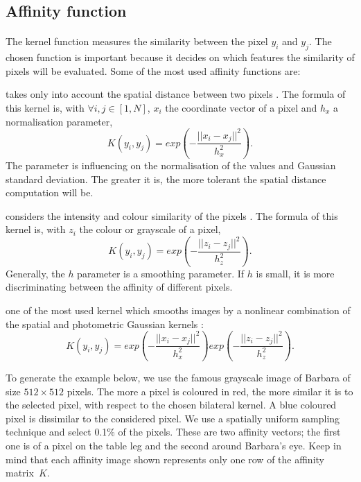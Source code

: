 \subsection{Affinity function}
\label{variations:affinity_functions}

\paragraph{}
The kernel function measures the similarity between the pixel \(y_i\) and \(y_j\).
The chosen function is important because it decides on which features the similarity of pixels will be evaluated.
Some of the most used affinity functions are:

\begin{description}[align=left]
 \item [Spatial Gaussian Kernel] takes only into account the spatial distance between two pixels \cite{siam_slides_2016}.
  The formula of this kernel is, with \(\forall i, j \in [1, N]\), \(x_i\) the coordinate vector of a pixel and \(h_x\) a normalisation parameter,
  \[K(y_i, y_j) = exp(-\frac{||x_i - x_j||^2}{h_x^2}).\]
  The parameter is influencing on the normalisation of the values and Gaussian standard deviation.
  The greater it is, the more tolerant the spatial distance computation will be.

 \item [Photometric Gaussian Kernel] considers the intensity and colour similarity of the pixels \cite{siam_slides_2016}.
  The formula of this kernel is, with \(z_i\) the colour or grayscale of a pixel,
  \[K(y_i, y_j) = exp(-\frac{||z_i - z_j||^2}{h_z^2}).\]
  Generally, the \(h\) parameter is a smoothing parameter.
  If \(h\) is small, it is more discriminating between the affinity of different pixels.

 \item [Bilateral Kernel] one of the most used kernel which smooths images by a nonlinear combination of the spatial and photometric Gaussian kernels \cite{siam_slides_2016} \cite{glide_2014} \cite{bilateral_tomasi_1998}:
  \[K(y_i, y_j) = exp(-\frac{||x_i - x_j||^2}{h_x^2}) exp(-\frac{||z_i - z_j||^2}{h_z^2}).\]

  To generate the example below, we use the famous grayscale image of Barbara of size \(512 \times 512\) pixels.
  The more a pixel is coloured in red, the more similar it is to the selected pixel, with respect to the chosen bilateral kernel.
  A blue coloured pixel is dissimilar to the considered pixel.
  We use a spatially uniform sampling technique and select 0.1\% of the pixels.
  These are two affinity vectors; the first one is of a pixel on the table leg and the second around Barbara's eye.
  Keep in mind that each affinity image shown represents only one row of the affinity matrix\ \(K\).


\end{description}
